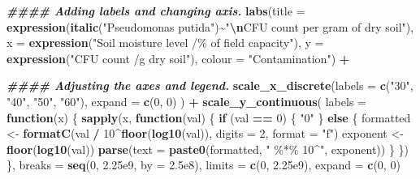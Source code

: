 \documentclass[
]{article}
\newenvironment{Shaded}{\begin{snugshade}}{\end{snugshade}}
\newcommand{\AttributeTok}[1]{\textcolor[rgb]{0.13,0.29,0.53}{#1}}
\newcommand{\ControlFlowTok}[1]{\textcolor[rgb]{0.13,0.29,0.53}{\textbf{#1}}}
\newcommand{\DecValTok}[1]{\textcolor[rgb]{0.00,0.00,0.81}{#1}}
\newcommand{\DocumentationTok}[1]{\textcolor[rgb]{0.56,0.35,0.01}{\textbf{\textit{#1}}}}
\newcommand{\FloatTok}[1]{\textcolor[rgb]{0.00,0.00,0.81}{#1}}
\newcommand{\FunctionTok}[1]{\textcolor[rgb]{0.13,0.29,0.53}{\textbf{#1}}}
\newcommand{\NormalTok}[1]{#1}
\newcommand{\OtherTok}[1]{\textcolor[rgb]{0.56,0.35,0.01}{#1}}
\newcommand{\SpecialCharTok}[1]{\textcolor[rgb]{0.81,0.36,0.00}{\textbf{#1}}}
\newcommand{\StringTok}[1]{\textcolor[rgb]{0.31,0.60,0.02}{#1}}
\begin{document}
\begin{Shaded}
\begin{Highlighting}[]
  \DocumentationTok{\#\#\#\# Adding labels and changing axis.}
  \FunctionTok{labs}\NormalTok{(}\AttributeTok{title =} \FunctionTok{expression}\NormalTok{(}\FunctionTok{italic}\NormalTok{(}\StringTok{"Pseudomonas putida"}\NormalTok{)}\SpecialCharTok{\textasciitilde{}}\StringTok{"}\SpecialCharTok{\textbackslash{}n}\StringTok{CFU count per gram of dry soil"}\NormalTok{),}
       \AttributeTok{x =} \FunctionTok{expression}\NormalTok{(}\StringTok{"Soil moisture level /\% of field capacity"}\NormalTok{),}
       \AttributeTok{y =} \FunctionTok{expression}\NormalTok{(}\StringTok{"CFU count /g dry soil"}\NormalTok{),}
       \AttributeTok{colour =} \StringTok{"Contamination"}\NormalTok{) }\SpecialCharTok{+}
  
  \DocumentationTok{\#\#\#\# Adjusting the axes and legend.}
  \FunctionTok{scale\_x\_discrete}\NormalTok{(}\AttributeTok{labels =} \FunctionTok{c}\NormalTok{(}\StringTok{"30"}\NormalTok{, }\StringTok{"40"}\NormalTok{, }\StringTok{"50"}\NormalTok{, }\StringTok{"60"}\NormalTok{),}
                   \AttributeTok{expand =} \FunctionTok{c}\NormalTok{(}\DecValTok{0}\NormalTok{, }\DecValTok{0}\NormalTok{)}
\NormalTok{  ) }\SpecialCharTok{+}
  \FunctionTok{scale\_y\_continuous}\NormalTok{(}
    \AttributeTok{labels =} \ControlFlowTok{function}\NormalTok{(x) \{}
      \FunctionTok{sapply}\NormalTok{(x, }\ControlFlowTok{function}\NormalTok{(val) \{}
        \ControlFlowTok{if}\NormalTok{ (val }\SpecialCharTok{==} \DecValTok{0}\NormalTok{) \{}
          \StringTok{"0"}
\NormalTok{        \} }\ControlFlowTok{else}\NormalTok{ \{}
\NormalTok{          formatted }\OtherTok{\textless{}{-}} \FunctionTok{formatC}\NormalTok{(val }\SpecialCharTok{/} \DecValTok{10}\SpecialCharTok{\^{}}\FunctionTok{floor}\NormalTok{(}\FunctionTok{log10}\NormalTok{(val)), }\AttributeTok{digits =} \DecValTok{2}\NormalTok{, }\AttributeTok{format =} \StringTok{"f"}\NormalTok{)}
\NormalTok{          exponent }\OtherTok{\textless{}{-}} \FunctionTok{floor}\NormalTok{(}\FunctionTok{log10}\NormalTok{(val))}
          \FunctionTok{parse}\NormalTok{(}\AttributeTok{text =} \FunctionTok{paste0}\NormalTok{(formatted, }\StringTok{" \%*\% 10\^{}"}\NormalTok{, exponent))}
\NormalTok{        \}}
\NormalTok{      \})}
\NormalTok{    \},}
    \AttributeTok{breaks =} \FunctionTok{seq}\NormalTok{(}\DecValTok{0}\NormalTok{, }\FloatTok{2.25e9}\NormalTok{, }\AttributeTok{by =} \FloatTok{2.5e8}\NormalTok{),}
    \AttributeTok{limits =} \FunctionTok{c}\NormalTok{(}\DecValTok{0}\NormalTok{, }\FloatTok{2.25e9}\NormalTok{),}
    \AttributeTok{expand =} \FunctionTok{c}\NormalTok{(}\DecValTok{0}\NormalTok{, }\DecValTok{0}\NormalTok{)}

\end{Highlighting}
\end{Shaded}
\end{document}
